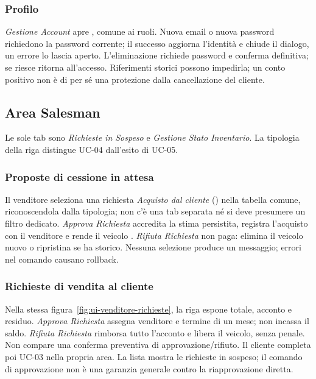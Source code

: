 \subsubsection{Profilo}
\emph{Gestione Account} apre , comune ai
ruoli. Nuova email o nuova password richiedono la password corrente;
il successo aggiorna l'identità e chiude il dialogo, un errore lo lascia
aperto. L'eliminazione richiede password e conferma definitiva; se riesce
ritorna all'accesso. Riferimenti storici possono impedirla; un conto
positivo non è di per sé una protezione dalla cancellazione del cliente.
\clearpage

\subsection{Area Salesman}
Le sole tab sono \emph{Richieste in Sospeso} e \emph{Gestione Stato Inventario}.
La tipologia della riga distingue UC-04 dall'esito di UC-05.

\subsubsection{Proposte di cessione in attesa}
Il venditore seleziona una richiesta \emph{Acquisto dal cliente}
() nella tabella comune, riconoscendola dalla tipologia;
non c'è una tab separata né si deve presumere un filtro dedicato.
\emph{Approva Richiesta} accredita la stima persistita, registra l'acquisto
con il venditore e rende il veicolo . \emph{Rifiuta Richiesta}
non paga: elimina il veicolo nuovo o ripristina  se ha storico.
Nessuna selezione produce un messaggio; errori nel comando causano rollback.

\subsubsection{Richieste di vendita al cliente}
Nella stessa figura~\ref{fig:ui-venditore-richieste}, la riga 
espone totale, acconto e residuo. \emph{Approva Richiesta} assegna venditore
e termine di un mese; non incassa il saldo. \emph{Rifiuta Richiesta}
rimborsa tutto l'acconto e libera il veicolo, senza penale. Non compare una
conferma preventiva di approvazione/rifiuto. Il cliente completa poi UC-03
nella propria area. La lista mostra le richieste in sospeso; il comando di
approvazione non è una garanzia generale contro la riapprovazione diretta.

